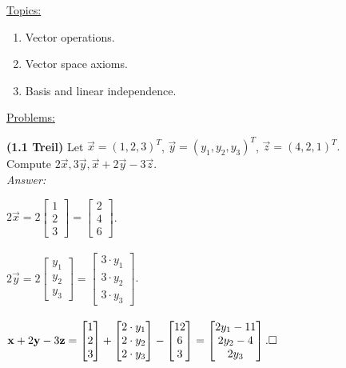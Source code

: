 \underline{Topics:}
	\begin{enumerate}
		\item Vector operations.
		\item Vector space axioms.
		\item Basis and linear independence.
	\end{enumerate}	
	\underline{Problems:}
	
	\noindent\textbf{(1.1 Treil)}
	Let $\vec{x} = (1,2,3)^T$,
	$\vec{y} = (y_1,y_2,y_3)^T$, 
	$\vec{z} = (4,2,1)^T.$ 
	\\Compute $2\vec{x}, 3\vec{y}, \vec{x}+2\vec{y}-3\vec{z}.$  	
	\\\textit{Answer:}
	
	$
	2\vec{x}=2 
	\begin{bmatrix}
	1\\2\\3
	\end{bmatrix}
	= \begin{bmatrix}
	2\\4\\6
	\end{bmatrix}
	$.\\\\

	$
	2\vec{y}=2 
	\begin{bmatrix}
	y_1\\y_2\\y_3
	\end{bmatrix}
	= \begin{bmatrix}
	3\cdot y_1\\3\cdot y_2\\3\cdot y_3
	\end{bmatrix}
	$.\\\\

	$
	\vec{x}+2\vec{y}-3\vec{z}= 
	\begin{bmatrix}
	1\\2\\3
	\end{bmatrix}+
	\begin{bmatrix}
	2\cdot y_1\\2\cdot y_2\\2\cdot y_3
	\end{bmatrix}-
	\begin{bmatrix}
	12\\6\\3
	\end{bmatrix}=
	\begin{bmatrix}
	2y_1-11\\2y_2-4\\2y_3
	\end{bmatrix}.
	\\\square $\\\\

